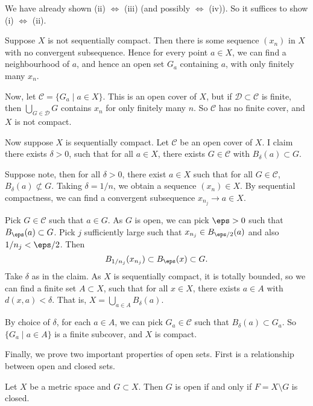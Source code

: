 \documentclass[12pt]{article}
\begin{document}
\begin{proofbox}
	We have already shown (ii) $\iff$ (iii) (and possibly $\iff$ (iv)). So it suffices to show (i) $\iff$ (ii).

		Suppose $X$ is not sequentially compact. Then there is some sequence $(x_n)$ in $X$ with no convergent subsequence. Hence for every point $a \in X$, we can find a neighbourhood of $a$, and hence an open set $G_a$ containing $a$, with only finitely many $x_n$.

		Now, let $\mathcal{C} = \{G_{a} \mid a \in X\}$. This is an open cover of $X$, but if $\mathcal{D} \subset \mathcal{C}$ is finite, then $\bigcup_{G \in \mathcal{D}} G$ contains $x_n$ for only finitely many $n$. So $\mathcal{C}$ has no finite cover, and $X$ is not compact.

		Now suppose $X$ is sequentially compact. Let $\mathcal{C}$ be an open cover of $X$. I claim there exists $\delta > 0$, such that for all $a \in X$, there exists $G \in \mathcal{C}$ with $B_{\delta}(a) \subset G$.

		Suppose note, then for all $\delta > 0$, there exist $a \in X$ such that for all $G \in \mathcal{C}$, $B_{\delta}(a) \not \subset G$. Taking $\delta = 1/n$, we obtain a sequence $(x_n) \in X$. By sequential compactness, we can find a convergent subsequence $x_{n_j} \to a \in X$.

		Pick $G \in \mathcal{C}$ such that $a \in G$. As $G$ is open, we can pick $\eps > 0$ such that $B_{\eps}(a) \subset G$. Pick $j$ sufficiently large such that $x_{n_j} \in B_{\eps/2}(a)$ and also $1/n_j < \eps/2$. Then
		\[
			B_{1/n_j}(x_{n_j}) \subset B_{\eps}(x) \subset G
		.\]
		Take $\delta$ as in the claim. As $X$ is sequentially compact, it is totally bounded, so we can find a finite set $A \subset X$, such that for all $x \in X$, there exists $a \in A$ with $d(x, a) < \delta$. That is, $X = \bigcup_{a \in A}B_{\delta}(a)$.

		By choice of $\delta$, for each $a \in A$, we can pick $G_{a} \in \mathcal{C}$ such that $B_{\delta}(a) \subset G_a$. So $\{G_a \mid a \in A\}$ is a finite subcover, and $X$ is compact.
\end{proofbox}

Finally, we prove two important properties of open sets. First is a relationship between open and closed sets.

\begin{proposition}
	Let $X$ be a metric space and $G \subset X$. Then $G$ is open if and only if $F = X \setminus G$ is closed.
\end{proposition}
\end{document}
